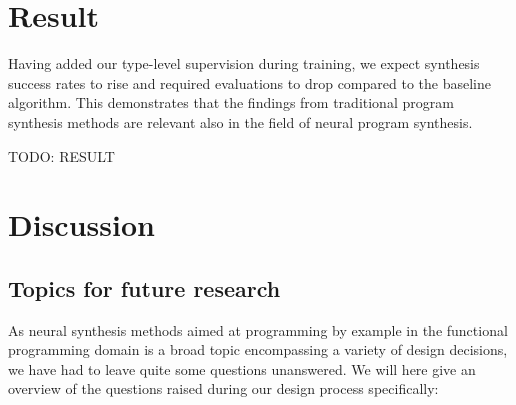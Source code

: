 \documentclass{article}
\begin{document}

\section{Result} %

Having added our type-level supervision during training, we expect synthesis success rates to rise and required evaluations to drop compared to the baseline algorithm.
This demonstrates that the findings from traditional program synthesis methods are relevant also in the field of neural program synthesis.

TODO: RESULT


\section{Discussion} %


\subsection{Topics for future research}

As neural synthesis methods aimed at programming by example in the functional
programming domain is a broad topic encompassing a variety of design decisions,
we have had to leave quite some questions unanswered.
We will here give an overview of the questions raised during our design process specifically:
\end{document}
